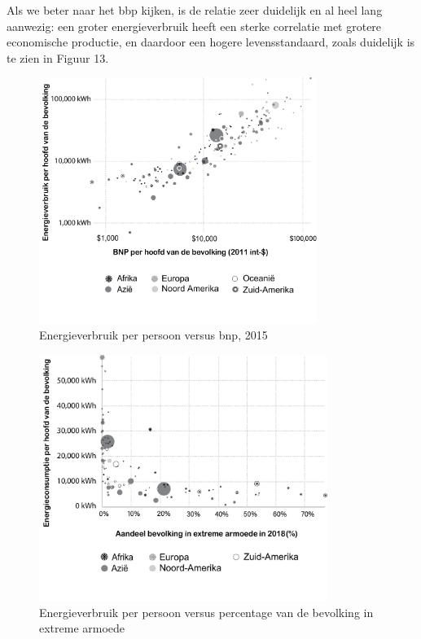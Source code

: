 Als we beter naar het bbp kijken, is de relatie zeer duidelijk en al heel lang aanwezig: een groter energieverbruik heeft een sterke correlatie met grotere economische productie, en daardoor een hogere levensstandaard, zoals duidelijk is te zien in Figuur 13.

\begin{figure}[H]
\centering
    \includegraphics[height=8cm]{figures/fig13.pdf}
    \caption[Energieverbruik per persoon versus bnp, 2015]{Energieverbruik per persoon versus bnp, 2015\footnotemark}
    \label{fig12}
\end{figure}

\begin{figure}[H]
\centering
    \includegraphics[height=8cm]{figures/fig14.pdf}
    \caption[Energieverbruik per persoon versus percentage van de bevolking in extreme armoede]{Energieverbruik per persoon versus percentage van de bevolking in extreme armoede\footnotemark}
    \label{fig12}
\end{figure}

